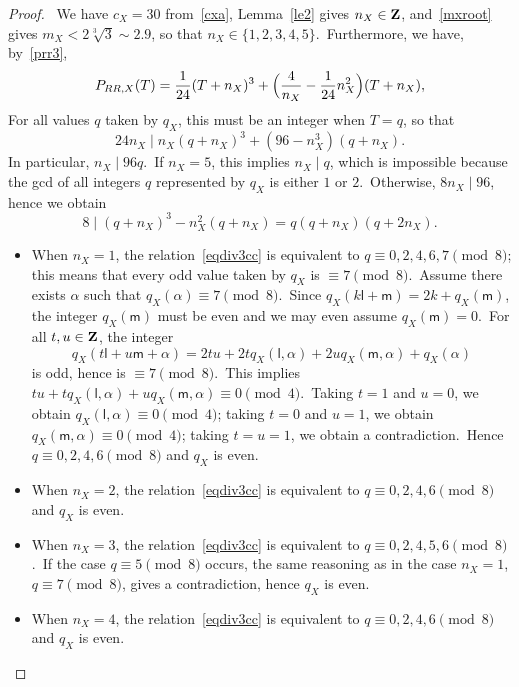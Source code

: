 \documentclass[12pt]{amsart}
\def\Z{{\bf Z}}
\theoremstyle{remark}
\def\lll{\ensuremath{\mathsf l}}
\def\mm{\ensuremath{\mathsf m}}
\begin{document}
\begin{proof}
\noindent{\bf{Assume  $ q_X(\lll,\mm)=1 $.}}\ We have $c_X=30$ from~\eqref{cxa}, Lemma~\ref{le2} gives $ n_X\in \Z$, and~\eqref{mxroot} gives $m_X<2\sqrt[3]{3}\sim 2.9 $, so that $n_X \in\{1,2,3,4,5\}$.\ Furthermore, we have, by~\eqref{prr3}, 
$$P_{RR,X}(T)=\frac{1}{24}(T+n_X)^3+\Bigl(\frac{4}{n_X}-\frac{1}{24}n_X^2\Bigr)(T+n_X),
$$
 For all values $q$ taken by $q_X$, this must be an integer when $T=q$, so that
\begin{equation*}%
24n_X\mid   n_X(q+n_X)^3+ (96- n_X^3 )(q+n_X).
\end{equation*}
 In particular, $n_X\mid 96 q$.\ If $n_X=5$, this implies $n_X\mid  q$, which is impossible because   the gcd of all integers $q$ represented by $q_X$ is either $1$ or $2$.\ Otherwise, $8n_X\mid 96$, hence we obtain
\begin{equation}\label{eqdiv3cc}
8 \mid  (q+n_X)^3 - n_X^2  (q+n_X)=q(q+n_X)(q+2n_X).
\end{equation}
\begin{itemize}
\item When $n_X=1$, the relation~\eqref{eqdiv3cc} is equivalent to  $q\equiv 0,2,4,6,7\pmod{8}$; this means that every odd value taken by $q_X$ is $\equiv  7\pmod{8}$.\ Assume there exists $\alpha$ such that    $q_X(\alpha)\equiv  7\pmod{8}$.\ Since $q_X(k\lll+\mm)= 2k+q_X(\mm)$, the integer $q_X(\mm)$ must be even and we may even assume $q_X(\mm)=0$.\    For all   $t,u\in\Z$, the integer
$$q_X(t\lll+u\mm+\alpha)=2tu+2tq_X(\lll,\alpha)+2uq_X(\mm,\alpha)+q_X(\alpha)
$$
is odd, hence is $\equiv  7\pmod{8}$.\ This implies $tu+ tq_X(\lll,\alpha)+ uq_X(\mm,\alpha)\equiv 0\pmod4$.\ Taking $t=1$ and $u=0$, we obtain $q_X(\lll,\alpha) \equiv 0\pmod4$; taking $t=0$ and $u=1$, we obtain $q_X(\mm,\alpha) \equiv 0\pmod4$; taking $t=u=1$, we obtain a contradiction.\ Hence $q\equiv 0,2,4,6\pmod{8}$ and $q_X$ is even.\ 
\item When $n_X=2$, the relation~\eqref{eqdiv3cc} is equivalent to  $q\equiv 0,2,4,6\pmod{8}$ and $q_X$ is even.
\item When $n_X=3$, the relation~\eqref{eqdiv3cc} is equivalent to  $q\equiv 0,2,4,5, 6\pmod{8}$.\ If the case $q\equiv 5\pmod{8}$ occurs, the same reasoning as in the case $n_X=1$,  $q\equiv 7\pmod{8}$, gives   a contradiction, hence $q_X$ is even.
\item When $n_X=4$, the relation~\eqref{eqdiv3cc} is equivalent to  $q\equiv 0,2,4,6\pmod{8}$ and $q_X$ is even.
 \end{itemize}

\medskip


\end{proof}
\end{document}
